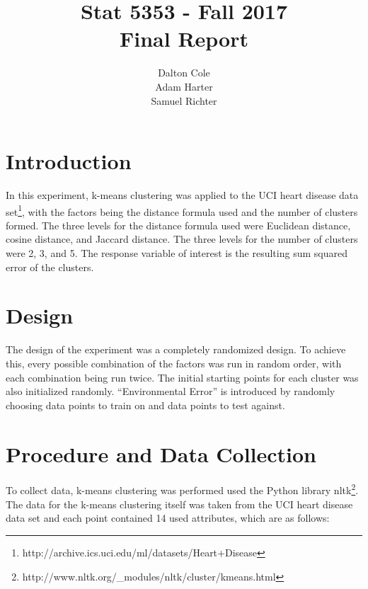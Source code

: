 \documentclass[times]{article}
\begin{document}
   \title{Stat 5353  - Fall 2017 \\ Final Report}
   \author{Dalton Cole \\ Adam Harter \\ Samuel Richter}
   \date{}
   \maketitle
   
   \section{Introduction}

   In this experiment, k-means clustering was applied to the UCI heart disease data 
   set\footnote{http://archive.ics.uci.edu/ml/datasets/Heart+Disease}, with the factors 
   being the distance formula used and the number of clusters formed.  
   The three levels for the distance formula used were Euclidean distance, 
   cosine distance, and Jaccard distance.  
   The three levels for the number of clusters were 2, 3, and 5.  
   The response variable of interest is the resulting sum squared error of the clusters.

   \section{Design}

   The design of the experiment was a completely randomized design.
   To achieve this, every possible combination of the factors was run in random order,
   with each combination being run twice.
   The initial starting points for each cluster was also initialized randomly.
   ``Environmental Error'' is introduced by randomly choosing data points to train on and
   data points to test against.

   \section{Procedure and Data Collection}

   To collect data, k-means clustering was performed used the Python library
   nltk\footnote{http://www.nltk.org/\_modules/nltk/cluster/kmeans.html}.
   The data for the k-means clustering itself was taken from the UCI heart disease
   data set and each point contained 14 used attributes, which are as follows:
\end{document}
